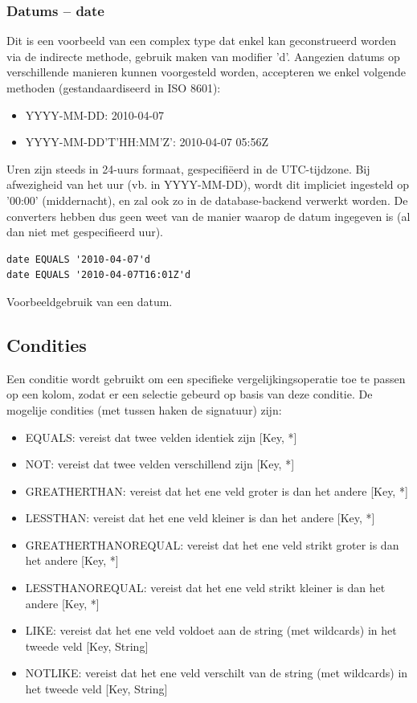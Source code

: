 \subsubsection{Datums -- date}

Dit is een voorbeeld van een complex type dat enkel kan geconstrueerd worden via de indirecte methode, gebruik maken van modifier 'd'. Aangezien datums op verschillende manieren kunnen voorgesteld worden, accepteren we enkel volgende methoden (gestandaardiseerd in ISO 8601):
\begin{itemize}
\item{YYYY-MM-DD: 2010-04-07}
\item{YYYY-MM-DD'T'HH:MM'Z': 2010-04-07 05:56Z}
\end{itemize}

Uren zijn steeds in 24-uurs formaat, gespecifi\"eerd in de UTC-tijdzone. Bij afwezigheid van het uur (vb. in YYYY-MM-DD), wordt dit impliciet ingesteld op '00:00' (middernacht), en zal ook zo in de database-backend verwerkt worden. De converters hebben dus geen weet van de manier waarop de datum ingegeven is (al dan niet met gespecifieerd uur).

\begin{code}
\begin{verbatim}
date EQUALS '2010-04-07'd
date EQUALS '2010-04-07T16:01Z'd
\end{verbatim}
\caption{Voorbeeldgebruik van een datum.}
\end{code}

\subsection{Condities}

Een conditie wordt gebruikt om een specifieke vergelijkingsoperatie toe te passen op een kolom, zodat er een selectie gebeurd op basis van deze conditie. De mogelije condities (met tussen haken de signatuur) zijn:

\begin{itemize}
\item EQUALS: vereist dat twee velden identiek zijn [Key, *]
\item NOT: vereist dat twee velden verschillend zijn [Key, *]
\item GREATHERTHAN: vereist dat het ene veld groter is dan het andere [Key, *]
\item LESSTHAN: vereist dat het ene veld kleiner is dan het andere [Key, *]
\item GREATHERTHANOREQUAL: vereist dat het ene veld strikt groter is dan het andere [Key, *]
\item LESSTHANOREQUAL: vereist dat het ene veld strikt kleiner is dan het andere [Key, *]
\item LIKE: vereist dat het ene veld voldoet aan de string (met wildcards) in het tweede veld [Key, String]
\item NOTLIKE: vereist dat het ene veld verschilt van de string (met wildcards) in het tweede veld [Key, String]
\end{itemize}


